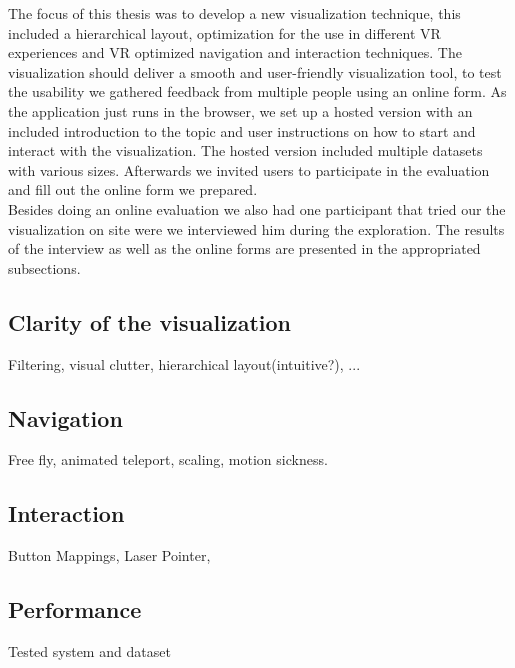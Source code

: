 The focus of this thesis was to develop a new visualization technique, this included a hierarchical layout, optimization for the use in different VR experiences and VR optimized navigation and interaction techniques.
The visualization should deliver a smooth and user-friendly visualization tool, to test the usability we gathered feedback from multiple people using an online form.
As the application just runs in the browser, we set up a hosted version \cite{thesisWebsite} with an included introduction to the topic and user instructions on how to start and interact with the visualization. The hosted version included multiple datasets with various sizes. Afterwards we invited users to participate in the evaluation and fill out the online form we prepared.
\\
Besides doing an online evaluation we also had one participant that tried our the visualization on site were we interviewed him during the exploration.
The results of the interview as well as the online forms are presented in the appropriated subsections.
\\
   
\subsection{Clarity of the visualization}
Filtering, visual clutter, hierarchical layout(intuitive?), ...

\subsection{Navigation}
Free fly, animated teleport, scaling, motion sickness.

\subsection{Interaction}
Button Mappings, Laser Pointer, 

\subsection{Performance}
Tested system and dataset